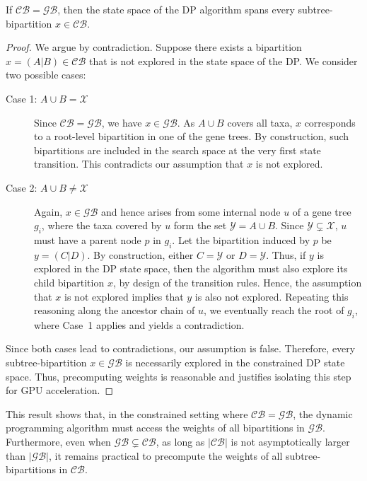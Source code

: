 \documentclass[10pt,a4paper]{article}
\begin{document}
\begin{theorem}
    \label{th:dp-span}
    If $\mathcal{CB} = \mathcal{GB}$, then the state space of the DP algorithm spans every subtree-bipartition $x \in \mathcal{CB}$.
\end{theorem}

\begin{proof}
    We argue by contradiction. Suppose there exists a bipartition $x = (A|B) \in \mathcal{CB}$ that is not explored in the state space of the DP. We consider two possible cases:

    \begin{description}
        \item[Case 1: $A \cup B = \mathcal{X}$]  
        Since $\mathcal{CB} = \mathcal{GB}$, we have $x \in \mathcal{GB}$. As $A \cup B$ covers all taxa, $x$ corresponds to a root-level bipartition in one of the gene trees. By construction, such bipartitions are included in the search space at the very first state transition. This contradicts our assumption that $x$ is not explored.

        \item[Case 2: $A \cup B \neq \mathcal{X}$]  
        Again, $x \in \mathcal{GB}$ and hence arises from some internal node $u$ of a gene tree $g_i$, where the taxa covered by $u$ form the set $\mathcal{Y} = A \cup B$. Since $\mathcal{Y} \subsetneq \mathcal{X}$, $u$ must have a parent node $p$ in $g_i$. Let the bipartition induced by $p$ be $y = (C|D)$. By construction, either $C = \mathcal{Y}$ or $D = \mathcal{Y}$. Thus, if $y$ is explored in the DP state space, then the algorithm must also explore its child bipartition $x$, by design of the transition rules. Hence, the assumption that $x$ is not explored implies that $y$ is also not explored. Repeating this reasoning along the ancestor chain of $u$, we eventually reach the root of $g_i$, where Case~1 applies and yields a contradiction.
    \end{description}

    Since both cases lead to contradictions, our assumption is false. Therefore, every subtree-bipartition $x \in \mathcal{GB}$ is necessarily explored in the constrained DP state space. Thus, precomputing weights is reasonable and justifies isolating this step for GPU acceleration.
\end{proof}

This result shows that, in the constrained setting where $\mathcal{CB} = \mathcal{GB}$, the dynamic programming algorithm must access the weights of all bipartitions in $\mathcal{GB}$. Furthermore, even when $\mathcal{GB} \subsetneq \mathcal{CB}$, as long as $|\mathcal{CB}|$ is not asymptotically larger than $|\mathcal{GB}|$, it remains practical to precompute the weights of all subtree-bipartitions in $\mathcal{CB}$.
\end{document}
